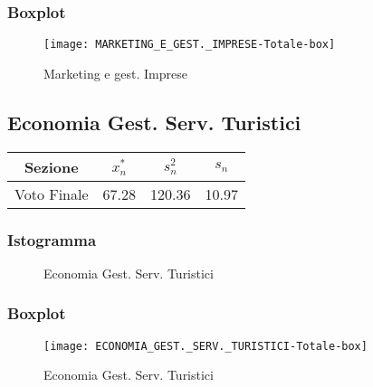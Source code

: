 \subsubsection{Boxplot}
\begin{figure}[!h]
  \centering
  \texttt{[image: MARKETING\_E\_GEST.\_IMPRESE-Totale-box]}
  \caption{Marketing e gest. Imprese}
\end{figure}
\restoregeometry
\clearpage

\thispagestyle{empty} %
\subsection{Economia Gest. Serv. Turistici}

\begin{center}
\begin{tabular}{|c|c|c|c|}
  \hline
  Sezione & \(x_{n}^{*}\) & \(s_n^2\) & \(s_n\) \\
  \hline
  Voto Finale & 67.28 & 120.36 & 10.97 \\
  \hline
\end{tabular}
\end{center}

\subsubsection{Istogramma}
\begin{figure}[!h]
  \caption{Economia Gest. Serv. Turistici}
\end{figure}

\subsubsection{Boxplot}
\begin{figure}[!h]
  \centering
  \texttt{[image: ECONOMIA\_GEST.\_SERV.\_TURISTICI-Totale-box]}
  \caption{Economia Gest. Serv. Turistici}
\end{figure}
\restoregeometry
\clearpage


